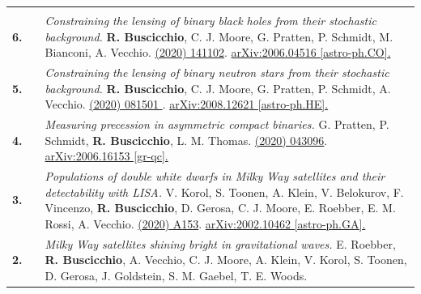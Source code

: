 {\begin{longtable}{rp{0.3cm}p{15.8cm}}
\vspace{0.09cm}\\
%
\textbf{6.} & & \textit{Constraining the lensing of binary black holes from their stochastic background.}
\newline{}
\textbf{R. Buscicchio}, C. J. Moore, G. Pratten, P. Schmidt, M. Bianconi, A. Vecchio.
\newline{}
\href{https://journals.aps.org/prl/abstract/10.1103/PhysRevLett.125.141102}{\prl 125 (2020) 141102}. \href{https://arxiv.org/abs/2006.04516}{arXiv:2006.04516 [astro-ph.CO].}
\vspace{0.09cm}\\
%
\textbf{5.} & & \textit{Constraining the lensing of binary neutron stars from their stochastic background.}
\newline{}
\textbf{R. Buscicchio}, C. J. Moore, G. Pratten, P. Schmidt, A. Vecchio.
\newline{}
\href{https://journals.aps.org/prd/abstract/10.1103/PhysRevD.102.081501}{\prd 102 (2020) 081501 }. \href{https://arxiv.org/abs/2008.12621}{arXiv:2008.12621 [astro-ph.HE].}
\vspace{0.09cm}\\
%
\textbf{4.} & & \textit{Measuring precession in asymmetric compact binaries.}
\newline{}
G. Pratten, P. Schmidt, \textbf{R. Buscicchio}, L. M. Thomas.
\newline{}
\href{https://journals.aps.org/prresearch/abstract/10.1103/PhysRevResearch.2.043096}{\prr 2 (2020) 043096}. \href{https://arxiv.org/abs/2006.16153}{arXiv:2006.16153 [gr-qc].}
\vspace{0.09cm}\\
%
\textbf{3.} & & \textit{Populations of double white dwarfs in Milky Way satellites and their detectability with LISA.}
\newline{}
V. Korol, S. Toonen, A. Klein, V. Belokurov, F. Vincenzo, \textbf{R. Buscicchio}, D. Gerosa, C. J. Moore, E. Roebber, E. M. Rossi, A. Vecchio.
\newline{}
\href{https://www.aanda.org/articles/aa/abs/2020/06/aa37764-20/aa37764-20.html}{\aap 638 (2020) A153}. \href{https://arxiv.org/abs/2002.10462}{arXiv:2002.10462 [astro-ph.GA].}
\vspace{0.09cm}\\
%
\textbf{2.} & & \textit{Milky Way satellites shining bright in gravitational waves.}
\newline{}
E. Roebber, \textbf{R. Buscicchio}, A. Vecchio, C. J. Moore, A. Klein, V. Korol, S. Toonen, D. Gerosa, J. Goldstein, S. M. Gaebel, T. E. Woods.

\end{longtable}}
